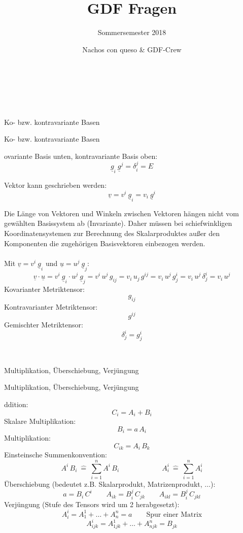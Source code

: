 \documentclass[DIV=1]{scrartcl}
\title{GDF Fragen}
\subtitle{Sommersemester 2018}
\author{Nachos con queso \& GDF-Crew}
\date{}
\newcommand{\frage}[3][10]{
    \newpage
    \
    \vspace{#1 em}
    \begin{framed}
        #2
    \end{framed}
    \newpage
    \begin{framed}
        #2
    \end{framed}
    \vspace{2 em}
}
\begin{document}
\maketitle \newpage
\ \newpage








\frage{Ko- bzw. kontravariante Basen}

Kovariante Basis unten, kontravariante Basis oben:
\[ \underline{g}_{i}\ \underline{g}^{j} = \delta_i^j = E \]

Vektor kann geschrieben werden:
\[
 \underline{v} = v^i \ \underline{g}_i = v_i \ \underline{g}^i
\]

Die Länge von Vektoren und Winkeln zwischen Vektoren hängen nicht vom gewählten Basissystem ab (Invariante). Daher müssen bei schiefwinkligen Koordinatensystemen zur Berechnung des Skalarproduktes außer den Komponenten die zugehörigen Basisvektoren einbezogen werden.\\
\ \\
Mit $\underline{v} = v^i \ \underline{g}_i$ und $\underline{u} = u^j\ \underline{g}_j$:
\[
    \underline{v} \cdot \underline{u} = v^i \ \underline{g}_i \cdot u^j\ \underline{g}_j
    = v^i\, u^j\, g_{ij}
    = v_i\, u_j\, g^{ij}
    = v_i\, u^j\, g^i_j
    = v_i\, u^j\, \delta^i_j
    = v_i\, u^j
\]
Kovarianter Metriktensor: \[g_{ij}\]
Kontravarianter Metriktensor: \[g^{ij}\]
Gemischter Metriktensor: \[\delta^i_j = g^i_j\]



\frage{Multiplikation, Überschiebung, Verjüngung}

Addition:
\[
    C_i = A_i + B_i
\]
Skalare Multiplikation:
\[
    B_i = a\, A_i
\]
Multiplikation:
\[
    C_{ik} = A_i\, B_k
\]
Einsteinsche Summenkonvention:
\[
    A^i\, B_i\ \hat{=}\ \sum_{i=1}^n A^i\, B_i
    \qquad\qquad\qquad
    A^i_i\ \hat{=}\ \sum_{i=1}^n A^i_i
\]
Überschiebung (bedeutet z.B. Skalarprodukt, Matrizenprodukt, $\dots$):
\[
    a = B_i\, C^i
    \qquad
    A_{ik} = B_i^j\, C_{jk}
    \qquad
    A_{ikl} = B_i^j\, C_{jkl}
\]
Verjüngung (Stufe des Tensors wird um 2 herabgesetzt):
\[
    A^i_i = A^1_1 + \dots + A^n_n = a \qquad \text{Spur einer Matrix}
\]
\[
    A^i_{ijk} = A^1_{1jk} + \dots + A^n_{njk} = B_{jk}
\]
\end{document}
